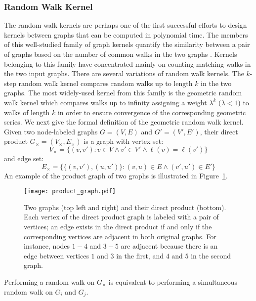 \documentclass[twoside,11pt]{article}
\begin{document}
\subsubsection{Random Walk Kernel}
The random walk kernels are perhaps one of the first successful efforts to design kernels between graphs that can be computed in polynomial time.
The members of this well-studied family of graph kernels quantify the similarity between a pair of graphs based on the number of common walks in the two graphs .
Kernels belonging to this family have concentrated mainly on counting matching walks in the two input graphs.
There are several variations of random walk kernels.
The $k$-step random walk kernel compares random walks up to length $k$ in the two graphs.
The most widely-used kernel from this family is the geometric random walk kernel  which compares walks up to infinity assigning a weight $\lambda^k$ ($\lambda < 1$) to walks of length $k$ in order to ensure convergence of the corresponding geometric series.
We next give the formal definition of the geometric random walk kernel.
Given two node-labeled graphs $G=(V,E)$ and $G'=(V',E')$, their direct product $G_\times=(V_\times,E_\times)$ is a graph with vertex set:
\begin{equation}
  V_{\times} = \{(v,v') : v \in V \wedge v' \in V' \wedge \ell(v) = \ell(v') \} 
\end{equation}
and edge set:
\begin{equation}
  E_{\times} = \{\{(v,v'),(u,u')\} : (v,u) \in E \wedge (v',u') \in E'\}
\end{equation}
An example of the product graph of two graphs is illustrated in Figure~\ref{fig:product_graph}.
\begin{figure}[t]
    \centering
    \texttt{[image: product\_graph.pdf]}
    \caption{Two graphs (top left and right) and their direct product (bottom). Each vertex of the direct product graph is labeled with a pair of vertices; an edge exists in the direct product if and only if the corresponding vertices are adjacent in both original graphs. For instance, nodes $1-4$ and $3-5$ are adjacent because there is an edge between vertices $1$ and $3$ in the first, and $4$ and $5$ in the second graph.}
    \label{fig:product_graph}
\end{figure}
Performing a random walk on $G_{\times}$ is equivalent to performing a simultaneous random walk on $G_i$ and $G_j$.
\end{document}
